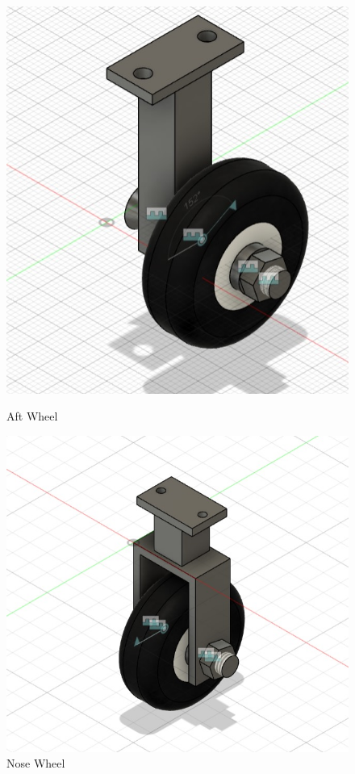 \documentclass[12 pt]{article}
\begin{document}
{{\begin{figure}[h!]
    \centering
    \begin{minipage}[b]{0.45\textwidth}
        \centering
        \includegraphics[width=\linewidth]{after wheel.jpeg}
        \caption{Aft Wheel}
        \label{fig:before-wheel}
    \end{minipage}
    \hfill
    \begin{minipage}[b]{0.45\textwidth}
        \centering
        \includegraphics[width=\linewidth]{nose wheel.jpeg}
        \caption{Nose Wheel}
        \label{fig:after-wheel}
    \end{minipage}
\end{figure}
\newpage

}}
\end{document}
